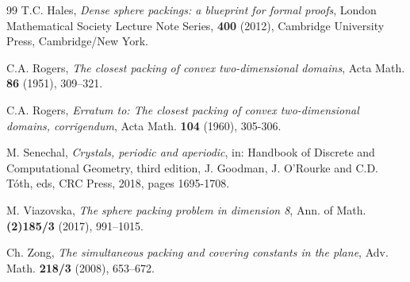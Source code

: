 \documentclass[11pt]{amsart}
\theoremstyle{definition}
\numberwithin{equation}{section}
\begin{document}
\begin{thebibliography}{99}
T.C. Hales, \emph{Dense sphere packings: a blueprint for formal proofs}, London Mathematical Society Lecture Note Series, \textbf{400} (2012), Cambridge University Press, Cambridge/New York.


 C.A. Rogers, \emph{The closest packing of convex two-dimensional domains}, Acta Math. \textbf{86} (1951), 309--321.

 C.A. Rogers, \emph{Erratum to: The closest packing of convex two-dimensional domains, corrigendum}, Acta Math. \textbf{104} (1960), 305-306.


 M. Senechal, \emph{Crystals, periodic and aperiodic}, in: Handbook of Discrete and Computational Geometry, third edition, J. Goodman, J. O'Rourke and C.D. T\'oth, eds, CRC Press, 2018, pages 1695-1708.

 M. Viazovska, \emph{The sphere packing problem in dimension 8}, Ann. of Math. \textbf{(2)185/3} (2017), 991--1015.

Ch. Zong, \emph{The simultaneous packing and covering constants in the plane}, Adv. Math. \textbf{218/3} (2008), 653--672.


\end{thebibliography}
\end{document}
